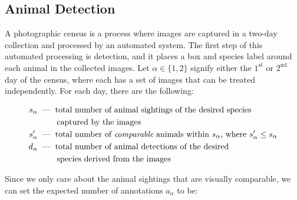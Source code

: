 \subsection{Animal Detection}

A photographic census is a process where images are captured in a two-day collection and processed by an automated system.  The first step of this automated processing is detection, and it places a box and species label around each animal in the collected images.  Let $\alpha \in \{1, 2\}$ signify either the $1^{\text{st}}$ or $2^{\text{nd}}$ day of the census, where each has a set of images that can be treated independently.  For each day, there are the following:

\begin{align*}
    \begin{split}
        s_{\alpha} &\textnormal{\hspace{0.2cm}---\hspace{0.2cm}} \text{total number of animal sightings of the desired species} \\
        &\hspace{0.82cm} \text{captured by the images} \\
        s^{\prime}_{\alpha} &\textnormal{\hspace{0.2cm}---\hspace{0.2cm}} \text{total number of {\it comparable} animals within $s_{\alpha}$, where $s^{\prime}_{\alpha} \leq s_{\alpha}$} \\
        d_{\alpha} &\textnormal{\hspace{0.2cm}---\hspace{0.2cm}} \text{total number of animal detections of the desired} \\
        &\hspace{0.82cm} \text{species derived from the images}
    \end{split}
\end{align*}

\noindent Since we only care about the animal sightings that are visually comparable, we can set the expected number of annotations $a_{\alpha}$ to be:

